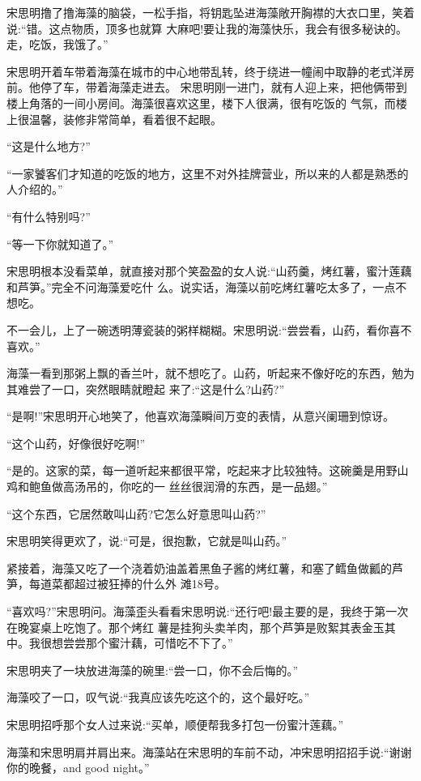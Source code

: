 \documentclass[11pt,a4paper,onecolumn]{article}
\begin{document}
宋思明撸了撸海藻的脑袋，一松手指，将钥匙坠进海藻敞开胸襟的大衣口里，笑着说:``错。这点物质，顶多也就算
大麻吧!要让我的海藻快乐，我会有很多秘诀的。走，吃饭，我饿了。''

宋思明开着车带着海藻在城市的中心地带乱转，终于绕进一幢闹中取静的老式洋房前。他停了车，带着海藻走进去。
宋思明刚一进门，就有人迎上来，把他俩带到楼上角落的一间小房间。海藻很喜欢这里，楼下人很满，很有吃饭的
气氛，而楼上很温馨，装修非常简单，看着很不起眼。

``这是什么地方?''

``一家饕客们才知道的吃饭的地方，这里不对外挂牌营业，所以来的人都是熟悉的人介绍的。''

``有什么特别吗?''

``等一下你就知道了。''

宋思明根本没看菜单，就直接对那个笑盈盈的女人说:``山药羹，烤红薯，蜜汁莲藕和芦笋。''完全不问海藻爱吃什
么。说实话，海藻以前吃烤红薯吃太多了，一点不想吃。

不一会儿，上了一碗透明薄瓷装的粥样糊糊。宋思明说:``尝尝看，山药，看你喜不喜欢。''

海藻一看到那粥上飘的香兰叶，就不想吃了。山药，听起来不像好吃的东西，勉为其难尝了一口，突然眼睛就瞪起
来了:``这是什么?山药?''

``是啊!''宋思明开心地笑了，他喜欢海藻瞬间万变的表情，从意兴阑珊到惊讶。

``这个山药，好像很好吃啊!''

``是的。这家的菜，每一道听起来都很平常，吃起来才比较独特。这碗羹是用野山鸡和鲍鱼做高汤吊的，你吃的一
丝丝很润滑的东西，是一品翅。''

``这个东西，它居然敢叫山药?它怎么好意思叫山药?''

宋思明笑得更欢了，说:``可是，很抱歉，它就是叫山药。''

紧接着，海藻又吃了一个浇着奶油盖着黑鱼子酱的烤红薯，和塞了鳕鱼做瓤的芦笋，每道菜都超过被狂捧的什么外
滩18号。

``喜欢吗?''宋思明问。海藻歪头看看宋思明说:``还行吧!最主要的是，我终于第一次在晚宴桌上吃饱了。那个烤红
薯是挂狗头卖羊肉，那个芦笋是败絮其表金玉其中。我很想尝尝那个蜜汁藕，可惜吃不下了。''

宋思明夹了一块放进海藻的碗里:``尝一口，你不会后悔的。''

海藻咬了一口，叹气说:``我真应该先吃这个的，这个最好吃。''

宋思明招呼那个女人过来说:``买单，顺便帮我多打包一份蜜汁莲藕。''

海藻和宋思明肩并肩出来。海藻站在宋思明的车前不动，冲宋思明招招手说:``谢谢你的晚餐，and good night。''
\end{document}
